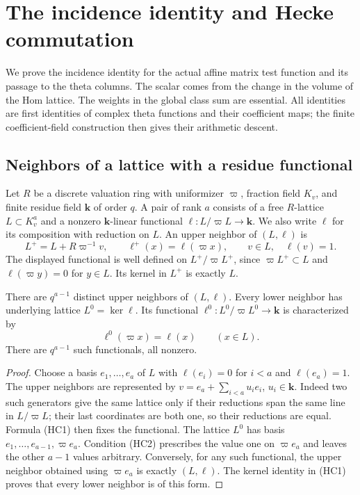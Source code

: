 \section{The incidence identity and Hecke commutation}
\label{hec-section}

We prove the incidence identity for the actual affine matrix test
function and its passage to the theta columns. The scalar comes from
the change in the volume of the Hom lattice. The weights in the
global class sum are essential. All identities are first identities
of complex theta functions and their coefficient maps; the finite
coefficient-field construction then gives their arithmetic descent.

\subsection{Neighbors of a lattice with a residue functional}

Let $R$ be a discrete valuation ring with uniformizer $\varpi$,
fraction field $K_v$, and finite residue field $\mathbf k$ of order
$q$. A pair of rank $a$ consists of a free $R$-lattice $L\subset K_v^a$
and a nonzero $\mathbf k$-linear functional
$\ell:L/\varpi L\to\mathbf k$. We also write $\ell$ for its
composition with reduction on $L$. An upper neighbor of $(L,\ell)$ is
\[
 L^+=L+R\varpi^{-1}v,\qquad
 \ell^+(x)=\ell(\varpi x),\qquad v\in L,\quad\ell(v)=1.
 \tag{HC1}
\]
The displayed functional is well defined on $L^+/\varpi L^+$,
since $\varpi L^+\subset L$ and $\ell(\varpi y)=0$ for $y\in L$.
Its kernel in $L^+$ is exactly $L$.

\begin{lemma}\label{hec-neighbors}
There are $q^{a-1}$ distinct upper neighbors of $(L,\ell)$.
Every lower neighbor has underlying lattice $L^0=\ker\ell$.
Its functional $\ell^0:L^0/\varpi L^0\to\mathbf k$ is characterized
by
\[
             \ell^0(\varpi x)=\ell(x)\qquad(x\in L).
 \tag{HC2}
\]
There are $q^{a-1}$ such functionals, all nonzero.
\end{lemma}
\begin{proof}
Choose a basis $e_1,\ldots,e_a$ of $L$ with
$\ell(e_i)=0$ for $i<a$ and $\ell(e_a)=1$. The upper neighbors are
represented by $v=e_a+\sum_{i<a}u_i e_i$, $u_i\in\mathbf k$.
Indeed two such generators give the same lattice only if their
reductions span the same line in $L/\varpi L$; their last coordinates
are both one, so their reductions are equal. Formula (HC1) then fixes
the functional. The lattice $L^0$ has basis
$e_1,\ldots,e_{a-1},\varpi e_a$. Condition (HC2) prescribes the value
one on $\varpi e_a$ and leaves the other $a-1$ values arbitrary.
Conversely, for any such functional, the upper neighbor obtained
using $\varpi e_a$ is exactly $(L,\ell)$. The kernel identity in
(HC1) proves that every lower neighbor is of this form.
\end{proof}

